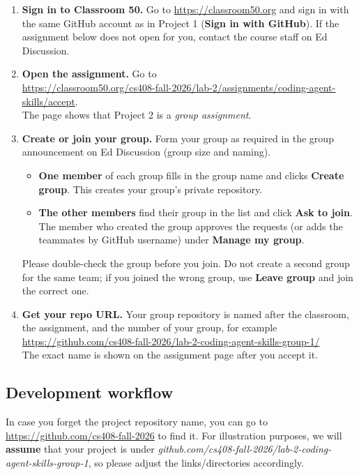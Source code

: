 \documentclass[letterpaper,11pt]{article}
\begin{document}
\begin{enumerate}
\item \textbf{Sign in to Classroom 50.}
  Go to \url{https://classroom50.org} and sign in with the same GitHub account
  as in Project 1 (\textbf{Sign in with GitHub}). If the assignment below does
  not open for you, contact the course staff on Ed Discussion.

\item \textbf{Open the assignment.}
  Go to\\
  \url{https://classroom50.org/cs408-fall-2026/lab-2/assignments/coding-agent-skills/accept}.\\
  The page shows that Project 2 is a \emph{group assignment}.

\item \textbf{Create or join your group.}
  Form your group as required in the group announcement on Ed Discussion
  (group size and naming).
  \begin{itemize}
  \item \textbf{One member} of each group fills in the group name and clicks
    \textbf{Create group}. This creates your group's private repository.
  \item \textbf{The other members} find their group in the list and click
    \textbf{Ask to join}. The member who created the group approves the
    requests (or adds the teammates by GitHub username) under
    \textbf{Manage my group}.
  \end{itemize}
  Please double-check the group before you join. Do not create a second group for
  the same team; if you joined the wrong group, use \textbf{Leave group} and
  join the correct one.

\item \textbf{Get your repo URL.}
  Your group repository is named after the classroom, the assignment, and the
  number of your group, for example\\
  \url{https://github.com/cs408-fall-2026/lab-2-coding-agent-skills-group-1/}\\
  The exact name is shown on the assignment page after you accept it.
\end{enumerate}

\subsection{Development workflow}
\label{sec:appx:workflow}

In case you forget the project repository name, you can go to
\url{https://github.com/cs408-fall-2026} to find it. For illustration
purposes, we will \textbf{assume} that your project is under
\emph{github.com/cs408-fall-2026/lab-2-coding-agent-skills-group-1}, so please adjust the links/directories accordingly.
\end{document}
